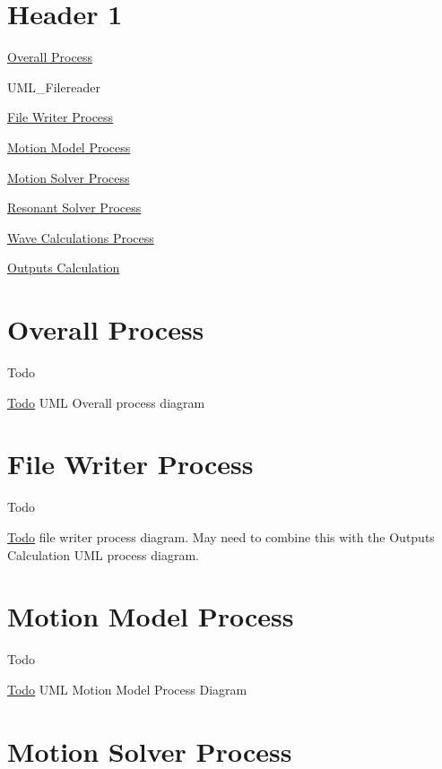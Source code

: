 \section*{Header 1}

\hyperlink{UML_Overall}{Overall Process}

U\-M\-L\-\_\-\-Filereader

\hyperlink{UML_WritingFiles}{File Writer Process}

\hyperlink{UML_MotionModel}{Motion Model Process}

\hyperlink{UML_MotionSolver}{Motion Solver Process}

\hyperlink{UML_ResonantSolver}{Resonant Solver Process}

\hyperlink{UML_WaveCalculation}{Wave Calculations Process}

\hyperlink{UML_OutputsCalculation}{Outputs Calculation} \hypertarget{UML_Overall}{}\section{Overall Process}\label{UML_Overall}
\begin{DoxyRefDesc}{Todo}
\item[\hyperlink{todo__todo000006}{Todo}]U\-M\-L Overall process diagram\end{DoxyRefDesc}
\hypertarget{UML_WritingFiles}{}\section{File Writer Process}\label{UML_WritingFiles}
\begin{DoxyRefDesc}{Todo}
\item[\hyperlink{todo__todo000009}{Todo}]file writer process diagram. May need to combine this with the Outputs Calculation U\-M\-L process diagram.\end{DoxyRefDesc}
\hypertarget{UML_MotionModel}{}\section{Motion Model Process}\label{UML_MotionModel}
\begin{DoxyRefDesc}{Todo}
\item[\hyperlink{todo__todo000003}{Todo}]U\-M\-L Motion Model Process Diagram\end{DoxyRefDesc}
\hypertarget{UML_MotionSolver}{}\section{Motion Solver Process}\label{UML_MotionSolver}
